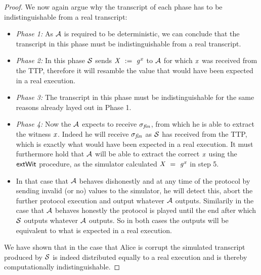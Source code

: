 \begin{proof}
    We now again argue why the transcript of each phase has to be indistinguishable from a real transcript:
    \begin{itemize}
        \item \textit{Phase 1:} As $\mathcal{A}$ is required to be deterministic, we can conclude that the transcript in this phase must be indistinguishable from a real transcript.
        \item \textit{Phase 2:} In this phase $\mathcal{S}$ sends $\mathit{X} ~:=~ \mathit{g}^{\mathit{x}}$ to $\mathcal{A}$ for which $\mathit{x}$ was received from the TTP, therefore it will resamble the value that would have been expected in a real execution.
        \item \textit{Phase 3:} The transcript in this phase must be indistinguishable for the same reasons already layed out in Phase 1.
        \item \textit{Phase 4:} Now the $\mathcal{A}$ expects to receive $\sigma_{\mathit{fin}}$, from which he is able to extract the witness $\mathit{x}$.
        Indeed he will receive $\sigma_{\mathit{fin}}$ as $\mathcal{S}$ has received from the TTP, which is exactly what would have been expected in a real execution.
        It must furthermore hold that $\mathcal{A}$ will be able to extract the correct $\mathit{x}$ using the $\mathsf{extWit}$ procedure, as the simulator calculated $\mathit{X} ~=~ \mathit{g}^{\mathit{x}}$ in step 5.
        \item In that case that $\mathcal{A}$ behaves dishonestly and at any time of the protocol by sending invalid (or no) values to the simulator, he will detect this, abort the further protocol execution and output whatever $\mathcal{A}$ outputs.
        Similarily in the case that $\mathcal{A}$ behaves honestly the protocol is played until the end after which $\mathcal{S}$ outputs whatever $\mathcal{A}$ outputs.
        So in both cases the outputs will be equivalent to what is expected in a real execution.
    \end{itemize}

    We have shown that in the case that Alice is corrupt the simulated transcript produced by $\mathcal{S}$ is indeed distributed equally to a real execution and is thereby computationally indistinguishable.


\end{proof}
